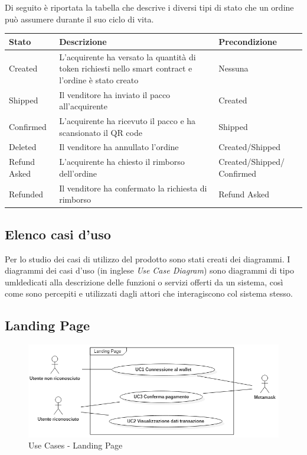 Di seguito è riportata la tabella che descrive i diversi tipi di stato che un ordine può assumere durante il suo ciclo di vita.
\begin{longtable}[c]{|l|p{7cm}|p{3cm}|}
\hline
\rowcolor{gray!40}
\textbf{Stato} & \textbf{Descrizione} & \textbf{Precondizione}  \\ \hline
\endhead

Created & L'acquirente ha versato la quantità di token richiesti nello smart contract e l'ordine è stato creato & Nessuna \\ \hline
Shipped & Il venditore ha inviato il pacco all'acquirente & Created \\ \hline
Confirmed & L'acquirente ha ricevuto il pacco e ha scansionato il QR code & Shipped \\ \hline
Deleted & Il venditore ha annullato l'ordine & Created/Shipped \\ \hline
Refund Asked & L'acquirente ha chiesto il rimborso dell'ordine & Created/Shipped/ Confirmed \\ \hline
Refunded & Il venditore ha confermato la richiesta di rimborso & Refund Asked \\ \hline
\end{longtable}

\subsection{Elenco casi d'uso}
Per lo studio dei casi di utilizzo del prodotto sono stati creati dei diagrammi.
I diagrammi dei casi d'uso (in inglese \emph{Use Case Diagram}) sono diagrammi di tipo \gls{uml}\glsfirstoccur dedicati alla descrizione delle funzioni o servizi offerti da un sistema, così come sono percepiti e utilizzati dagli attori che interagiscono col sistema stesso.

\subsection{Landing Page}
\begin{figure}[!h] 
    \centering 
    \includegraphics[width=1\columnwidth]{immagini/usecase/UCLandingPage.png} 
    \caption{Use Cases - Landing Page}
\end{figure}

